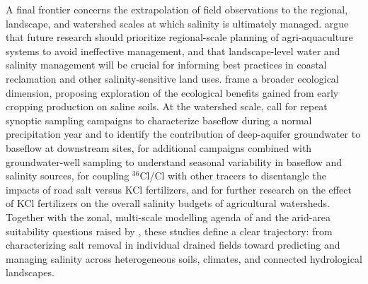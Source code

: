 \documentclass[11pt]{article}
\begin{document}
A final frontier concerns the extrapolation of field observations to the regional, landscape, and watershed scales at which salinity is ultimately managed. \textcite{Yu2025} argue that future research should prioritize regional-scale planning of agri-aquaculture systems to avoid ineffective management, and that landscape-level water and salinity management will be crucial for informing best practices in coastal reclamation and other salinity-sensitive land uses. \textcite{Chen2025} frame a broader ecological dimension, proposing exploration of the ecological benefits gained from early cropping production on saline soils. At the watershed scale, \textcite{Frisbee2022} call for repeat synoptic sampling campaigns to characterize baseflow during a normal precipitation year and to identify the contribution of deep-aquifer groundwater to baseflow at downstream sites, for additional campaigns combined with groundwater-well sampling to understand seasonal variability in baseflow and salinity sources, for coupling $^{36}$Cl/Cl with other tracers to disentangle the impacts of road salt versus KCl fertilizers, and for further research on the effect of KCl fertilizers on the overall salinity budgets of agricultural watersheds. Together with the zonal, multi-scale modelling agenda of \textcite{Zhu2025b} and the arid-area suitability questions raised by \textcite{Guo2024b}, these studies define a clear trajectory: from characterizing salt removal in individual drained fields toward predicting and managing salinity across heterogeneous soils, climates, and connected hydrological landscapes.

\printbibliography
\end{document}
